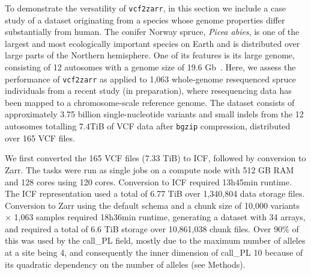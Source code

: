 \documentclass[a4paper,num-refs]{oup-contemporary}
\begin{document}
To demonstrate the versatility of \texttt{vcf2zarr}, in this section
we include a case study of a dataset originating from a species whose
genome properties differ substantially from human. The conifer Norway
spruce, \emph{Picea abies}, is one of the largest and most
ecologically important species on Earth and is distributed over large
parts of the Northern hemisphere. One of its features is its large
genome, consisting of 12 autosomes with a genome size of 19.6
Gb~\cite{nystedt_NorwaySpruceGenome_2013}. Here, we assess the
performance of \texttt{vcf2zarr} as applied to 1,063 whole-genome
resequenced spruce individuals from a recent study (in preparation),
where resequencing data has been mapped to a chromosome-scale
reference genome. The dataset consists of approximately 3.75 billion
single-nucleotide variants and small indels from the 12 autosomes
totalling 7.4TiB of VCF data after \texttt{bgzip} compression,
distributed over 165 VCF files. 

We first converted the 165 VCF files (7.33 TiB) to ICF, followed by
conversion to Zarr. The tasks were run as single jobs on a compute
node with 512 GB RAM and 128 cores using 120 cores. Conversion to ICF
required 13h45min runtime. The ICF representation used a total of 6.77
TiB over 1,340,804 data storage files. Conversion to Zarr 
using the default schema and a chunk size of 10,000 variants
$\times$ 1,063 samples
required 18h36min runtime, generating a dataset with 34 arrays, 
and required a total of 6.6 TiB storage over 10,861,038 chunk files. 
Over 90\% of this was used by the call\_PL field, mostly due to 
the maximum number of alleles at a site being 4,
and consequently the inner dimension of call\_PL 10 because 
of its quadratic dependency on the number of alleles (see Methods).
\end{document}
